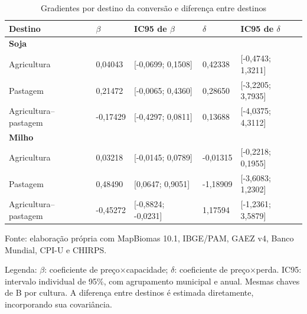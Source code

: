 \begin{table}[H]
\centering
\normalsize
\setlength{\tabcolsep}{2pt}
\renewcommand{\arraystretch}{1}
\normalcaption\captionstyle{\centering}
\caption{Gradientes por destino da conversão e diferença entre destinos}
\label{tab:h1-destinos-robustez}
\begin{tabular}{p{3.4cm}p{2.0cm}p{3.9cm}p{2.0cm}p{3.9cm}}
\hline
Destino & $\beta$ & IC95 de $\beta$ & $\delta$ & IC95 de $\delta$ \\
\hline\multicolumn{5}{l}{\textbf{Soja}} \\
Agricultura & 0,04043 & [-0,0699; 0,1508] & 0,42338 & [-0,4743; 1,3211] \\
Pastagem & 0,21472 & [-0,0065; 0,4360] & 0,28650 & [-3,2205; 3,7935] \\
Agricultura--pastagem & -0,17429 & [-0,4297; 0,0811] & 0,13688 & [-4,0375; 4,3112] \\
\hline\multicolumn{5}{l}{\textbf{Milho}} \\
Agricultura & 0,03218 & [-0,0145; 0,0789] & -0,01315 & [-0,2218; 0,1955] \\
Pastagem & 0,48490 & [0,0647; 0,9051] & -1,18909 & [-3,6083; 1,2302] \\
Agricultura--pastagem & -0,45272 & [-0,8824; -0,0231] & 1,17594 & [-1,2361; 3,5879] \\
\hline\end{tabular}
\par\smallskip
\begin{minipage}{\textwidth}\normalsize\centering
Fonte: elaboração própria com MapBiomas 10.1, IBGE/PAM, GAEZ v4, Banco Mundial, CPI-U e CHIRPS.
\par\medskip
\raggedright Legenda: $\beta$: coeficiente de preço×capacidade; $\delta$: coeficiente de preço×perda. IC95: intervalo individual de 95\%, com agrupamento municipal e anual. Mesmas chaves de B por cultura. A diferença entre destinos é estimada diretamente, incorporando sua covariância.
\end{minipage}
\end{table}
